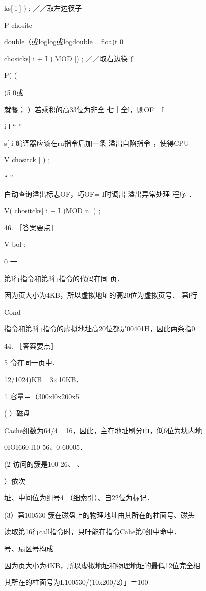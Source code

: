 {{    ks[ i ] ) ;     ／／取左边筷子

    P chositc

    double（或loglog或logdouble .. floa)t 0

    chosicks[  i  + I ) MOD  ]) ;    ／／取右边筷子

    P(     (

    (5    0或

    就餐；    ）若乘积的高33位为非全    七｜全l，则OF= I

    i   l    “    ”

    s[ i    编译器应该在ru指令后加一条 溢出自陷指令 ，使得CPU

    V chositck   ] ) ;

    “    ”

    白动查询溢出标忐OF，巧OF= I时调出 溢出异常处理 程序 ．

    V( chositcks[ i  + I )MOD n] ) ;

    46. ［答案要点］

    V  bol ;

    0    一

    第l行指令和第3行指令的代码在同   页．

    因为页大小为4KB，所以虚拟地址的高20位为虚拟页号． 第l行

   Cond

    指令和第3行指令的虚拟地址高20位都是00401H，因此两条指0

44. ［答案要点］

    5    令在同一页中．

    12/1024)KB= 3×10KB．

    1     容量＝（300xl0x200x5

   ( ）磁盘

    Cache组数为64/4= 16，因此，主存地址刷分巾，低6位为块内地

    0IOI660 l10 56、0 60005．

   (2    访问的簇是100 26、    、

    ）依次

    址、中间位为组号4    （细索引）、自22位为标记．

   (3）第100530 簇在磁盘上的物理地址由其所在的柱面号、磁头

    读取第16行call指令时，只吁能在指令Cahe第0组中命中．

    号、扇区号构成

    因为页大小为4KB，所以虚拟地址和物理地址的最低12位完全相

    其所在的柱面号为L100530/(10x200/2）」＝100

}}
